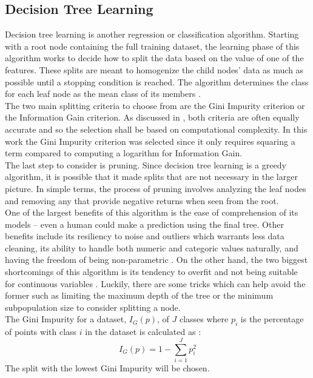 \documentclass[titlepage]{article}
\begin{document}
\subsection{Decision Tree Learning}
Decision tree learning is another regression or classification algorithm. Starting with a root node containing the full training dataset, the learning phase of this algorithm works to decide how to split the data based on the value of one of the features. These splits are meant to homogenize the child nodes' data as much as possible until a stopping condition is reached. The algorithm determines the class for each leaf node as the mean class of its members \cite{Gini-Index}.\\
The two main splitting criteria to choose from are the Gini Impurity criterion or the Information Gain criterion. As discussed in \cite{Gini-Index}, both criteria are often equally accurate and so the selection shall be based on computational complexity. In this work the Gini Impurity criterion was selected since it only requires squaring a term compared to computing a logarithm for Information Gain.\\
The last step to consider is pruning. Since decision tree learning is a greedy algorithm, it is possible that it made splits that are not necessary in the larger picture. In simple terms, the process of pruning involves analyzing the leaf nodes and removing any that provide negative returns when seen from the root.\\
One of the largest benefits of this algorithm is the ease of comprehension of its models -- even a human could make a prediction using the final tree. Other benefits include its resiliency to noise and outliers \cite{DecisionTreeOG} which warrants less data cleaning, its ability to handle both numeric and categoric values naturally, and having the freedom of being non-parametric \cite{DecisionTreeNonPara}. On the other hand, the two biggest shortcomings of this algorithm is its tendency to overfit \cite{DecisionTreeOG} and not being suitable for continuous variables \cite{DecisionTreeOG}. Luckily, there are some tricks which can help avoid the former such as limiting the maximum depth of the tree or the minimum subpopulation size to consider splitting a node.\\
The Gini Impurity for a dataset, $I_G(p)$, of $J$ classes where $p_i$ is the percentage of points with class $i$ in the dataset is calculated as \cite{Gini-Index}:
$$I_G(p) = 1 - \sum\limits_{i=1}^J p_i^2$$
The split with the lowest Gini Impurity will be chosen.
\end{document}
